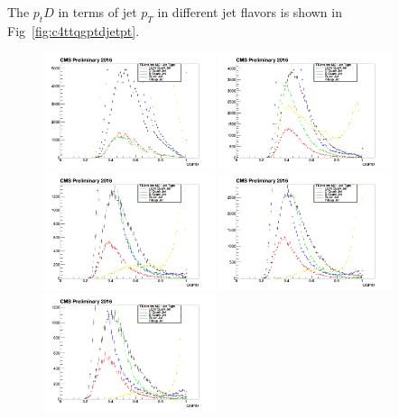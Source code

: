 The $p_{t}D$ in terms of jet $p_{T}$ in different jet flavors is shown in Fig~\ref{fig:c4ttqgptdjetpt}.
\begin{figure}[htbp]
 \begin{center}
  \includegraphics[width=0.45\textwidth]{sections/mc4/TopTagger/figures/_b_qgptdjetptbin0_.png}
  \includegraphics[width=0.45\textwidth]{sections/mc4/TopTagger/figures/_b_qgptdjetptbin1_.png} \\
  \includegraphics[width=0.45\textwidth]{sections/mc4/TopTagger/figures/_b_qgptdjetptbin2_.png}
  \includegraphics[width=0.45\textwidth]{sections/mc4/TopTagger/figures/_b_qgptdjetptbin3_.png} \\
  \includegraphics[width=0.45\textwidth]{sections/mc4/TopTagger/figures/_b_qgptdjetptbin4_.png}

\end{center}
\end{figure}
